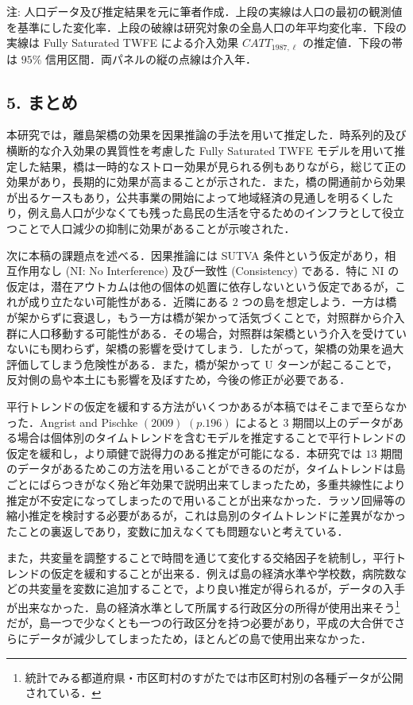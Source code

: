 注:
人口データ及び推定結果を元に筆者作成．上段の実線は人口の最初の観測値を基準にした変化率．上段の破線は研究対象の全島人口の年平均変化率．下段の実線は
Fully Saturated TWFE による介入効果 \(CATT_{1987, \ell}\)
の推定値．下段の帯は \(95\%\) 信用区間．両パネルの縦の点線は介入年．

\hypertarget{ux307eux3068ux3081}{%
\subsection{5. まとめ}\label{ux307eux3068ux3081}}

本研究では，離島架橋の効果を因果推論の手法を用いて推定した．時系列的及び横断的な介入効果の異質性を考慮した
Fully Saturated TWFE
モデルを用いて推定した結果，橋は一時的なストロー効果が見られる例もありながら，総じて正の効果があり，長期的に効果が高まることが示された．また，橋の開通前から効果が出るケースもあり，公共事業の開始によって地域経済の見通しを明るくしたり，例え島人口が少なくても残った島民の生活を守るためのインフラとして役立つことで人口減少の抑制に効果があることが示唆された．

次に本稿の課題点を述べる．因果推論には SUTVA
条件という仮定があり，相互作用なし (NI: No Interference) 及び一致性
(Consistency) である．特に NI
の仮定は，潜在アウトカムは他の個体の処置に依存しないという仮定であるが，これが成り立たない可能性がある．近隣にある
\(2\)
つの島を想定しよう．一方は橋が架からずに衰退し，もう一方は橋が架かって活気づくことで，対照群から介入群に人口移動する可能性がある．その場合，対照群は架橋という介入を受けていないにも関わらず，架橋の影響を受けてしまう．したがって，架橋の効果を過大評価してしまう危険性がある．また，橋が架かって
U
ターンが起こることで，反対側の島や本土にも影響を及ぼすため，今後の修正が必要である．

平行トレンドの仮定を緩和する方法がいくつかあるが本稿ではそこまで至らなかった．Angrist
and Pischke \((2009)\) \((p.196)\) によると \(3\)
期間以上のデータがある場合は個体別のタイムトレンドを含むモデルを推定することで平行トレンドの仮定を緩和し，より頑健で説得力のある推定が可能になる．本研究では
\(13\)
期間のデータがあるためこの方法を用いることができるのだが，タイムトレンドは島ごとにばらつきがなく殆ど年効果で説明出来てしまったため，多重共線性により推定が不安定になってしまったので用いることが出来なかった．ラッソ回帰等の縮小推定を検討する必要があるが，これは島別のタイムトレンドに差異がなかったことの裏返しであり，変数に加えなくても問題ないと考えている．

また，共変量を調整することで時間を通じて変化する交絡因子を統制し，平行トレンドの仮定を緩和することが出来る．例えば島の経済水準や学校数，病院数などの共変量を変数に追加することで，より良い推定が得られるが，データの入手が出来なかった．島の経済水準として所属する行政区分の所得が使用出来そう\footnote{統計でみる都道府県・市区町村のすがたでは市区町村別の各種データが公開されている．}だが，島一つで少なくとも一つの行政区分を持つ必要があり，平成の大合併でさらにデータが減少してしまったため，ほとんどの島で使用出来なかった．

